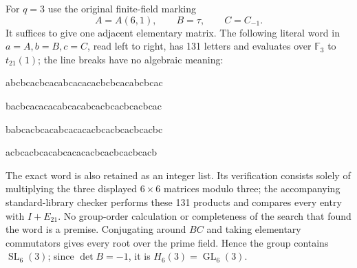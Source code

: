 \documentclass[11pt,a4paper]{article}
\newcommand{\GL}{\operatorname{GL}}
\newcommand{\SL}{\operatorname{SL}}
\newcommand{\F}{\mathbb F}
\begin{document}
For $q=3$ use the original finite-field marking
\[
 A=A(6,1),\qquad B=\tau,\qquad C=C_{-1}.
\]
It suffices to give one adjacent elementary matrix. The following
literal word in $a=A,b=B,c=C$, read left to right, has 131 letters
and evaluates over $\F_3$ to $t_{21}(1)$; the line breaks have no
algebraic meaning:
\begin{center}\small\ttfamily
abcbcacbcacabcacacacbcbcacabcbcac\par
bacbcacacacabcacabcacbcacbcacbcac\par
babcacbcacabcacacacbcacbcacbcacbc\par
acbcacbcacabcacacacbcacbcacbcacb
\end{center}
The exact word is also retained as an integer list. Its verification
consists solely of multiplying the three displayed $6\times6$ matrices
modulo three; the accompanying standard-library checker performs these
131 products and compares every entry with $I+E_{21}$. No group-order
calculation or completeness of the search that found the word is a
premise. Conjugating around $BC$ and taking elementary commutators
gives every root over the prime field. Hence the group contains
$\SL_6(3)$; since $\det B=-1$, it is $H_6(3)=\GL_6(3)$.
\end{document}
